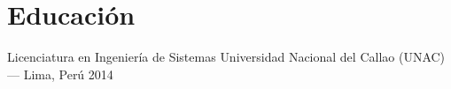 
\section{Educación}

\cvEduEntry%
  {Licenciatura en Ingeniería de Sistemas}%
  {Universidad Nacional del Callao (UNAC) --- Lima, Perú}%
  {2014}
